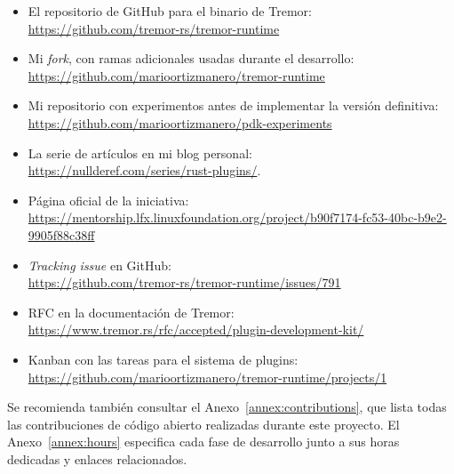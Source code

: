 \begin{itemize}
    \item El repositorio de GitHub para el binario de Tremor:\\
        \url{https://github.com/tremor-rs/tremor-runtime}

    \item Mi \emph{fork}, con ramas adicionales usadas durante el desarrollo:\\
        \url{https://github.com/marioortizmanero/tremor-runtime}

    \item Mi repositorio con experimentos antes de implementar la versión
        definitiva:\\
        \url{https://github.com/marioortizmanero/pdk-experiments}

    \item La serie de artículos en mi blog personal:\\
        \url{https://nullderef.com/series/rust-plugins/}.

    \item Página oficial de la iniciativa:\\
        \url{https://mentorship.lfx.linuxfoundation.org/project/b90f7174-fc53-40bc-b9e2-9905f88c38ff}

    \item \emph{Tracking issue} en GitHub:\\
        \url{https://github.com/tremor-rs/tremor-runtime/issues/791}

    \item RFC en la documentación de Tremor:\\
        \url{https://www.tremor.rs/rfc/accepted/plugin-development-kit/}

    \item Kanban con las tareas para el sistema de plugins:\\
        \url{https://github.com/marioortizmanero/tremor-runtime/projects/1}
\end{itemize}

Se recomienda también consultar el Anexo~\ref{annex:contributions}, que lista
todas las contribuciones de código abierto realizadas durante este proyecto. El
Anexo~\ref{annex:hours} especifica cada fase de desarrollo junto a sus horas
dedicadas y enlaces relacionados.
